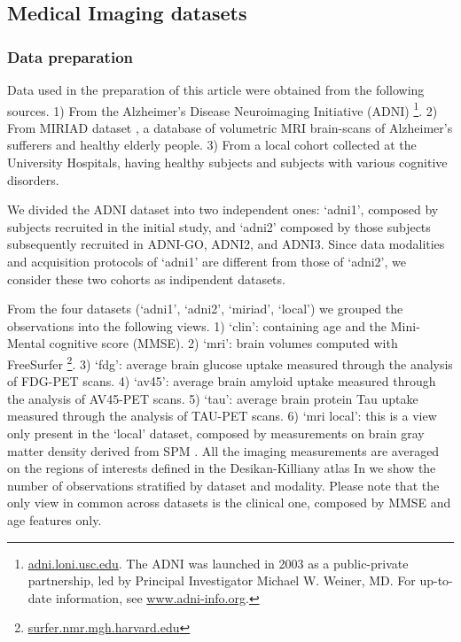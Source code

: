 \subsection{Medical Imaging datasets}
\label{ssec:real}





\subsubsection{Data preparation}
Data used in the preparation of this article were obtained from the following sources.
1) From the Alzheimer's Disease Neuroimaging Initiative (ADNI)
\footnote{
\href{http://adni.loni.usc.edu}{adni.loni.usc.edu}. The ADNI was launched in 2003 as a public-private partnership, led by Principal Investigator Michael W. Weiner, MD. For up-to-date information, see \href{www.adni-info.org}{www.adni-info.org}.
}.
2) From MIRIAD dataset \cite{Miriad}, a database of volumetric MRI brain-scans of Alzheimer's sufferers and healthy elderly people.
3) From a local cohort collected at the University Hospitals, having healthy subjects and subjects with various cognitive disorders.

We divided the ADNI dataset into two independent ones:
`adni1', composed by subjects recruited in the initial study,
and `adni2' composed by those subjects subsequently recruited in ADNI-GO, ADNI2, and ADNI3.
Since data modalities and acquisition protocols of `adni1' are different from those of `adni2', we consider these two cohorts as indipendent datasets.

From the four datasets (`adni1', `adni2', `miriad', `local') we grouped the observations into the following views.
1) `clin': containing age and the Mini-Mental cognitive score (MMSE).
2) `mri': brain volumes computed with FreeSurfer \footnote{
\href{https://surfer.nmr.mgh.harvard.edu/}{surfer.nmr.mgh.harvard.edu}
}.
3) `fdg': average brain glucose uptake measured through the analysis of FDG-PET scans.
4) `av45': average brain amyloid uptake measured through the analysis of AV45-PET scans.
5) `tau': average brain protein Tau uptake measured through the analysis of TAU-PET scans.
6) `mri local': this is a view only present in the `local' dataset, composed by measurements on brain gray matter density derived from SPM \cite{Ashburner2000}.
All the imaging measurements are averaged on the regions of interests defined in the Desikan-Killiany atlas \cite{Desikan2006}
In  we show the number of observations stratified by dataset and modality.
Please note that the only view in common across datasets is the clinical one, composed by MMSE and age features only.

